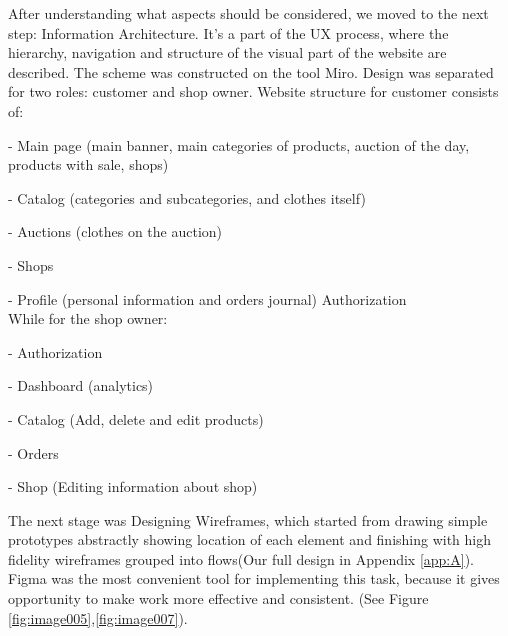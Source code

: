After understanding what aspects should be considered, we moved to the next step: Information Architecture. It’s a part of the UX process, where the hierarchy, navigation and structure of the visual part of the website are described. The scheme was constructed on the tool Miro. Design was separated for two roles: customer and shop owner.
Website structure for customer consists of: 

- Main page (main banner, main categories of products, auction of the day, products with sale, shops)

- Catalog (categories and subcategories, and clothes itself)

- Auctions (clothes on the auction)

- Shops

- Profile (personal information and orders journal)
Authorization\\

While for the shop owner:

- Authorization

- Dashboard (analytics)

- Catalog (Add, delete and edit products)

- Orders

- Shop (Editing information about shop)

The next stage was Designing Wireframes, which started from drawing simple prototypes abstractly showing location of each element and finishing with high fidelity wireframes grouped into flows(Our full design in Appendix \ref{app:A}). Figma was the most convenient tool for implementing this task, because it gives opportunity to make work more effective and consistent. (See Figure \ref{fig:image005},\ref{fig:image007}).

